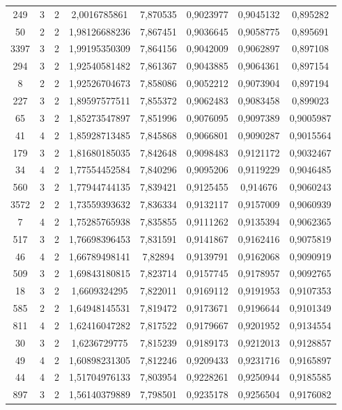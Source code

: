 \begin{longtable}{|c|c|c|c|c|c|c|c|}
249 & 3 & 2 & 2,0016785861 & 7,870535 & 0,9023977 & 0,9045132 & 0,895282 \\
50 & 2 & 2 & 1,98126688236 & 7,867451 & 0,9036645 & 0,9058775 & 0,895691 \\
3397 & 3 & 2 & 1,99195350309 & 7,864156 & 0,9042009 & 0,9062897 & 0,897108 \\
294 & 3 & 2 & 1,92540581482 & 7,861367 & 0,9043885 & 0,9064361 & 0,897154 \\
8 & 2 & 2 & 1,92526704673 & 7,858086 & 0,9052212 & 0,9073904 & 0,897194 \\
227 & 3 & 2 & 1,89597577511 & 7,855372 & 0,9062483 & 0,9083458 & 0,899023 \\
65 & 3 & 2 & 1,85273547897 & 7,851996 & 0,9076095 & 0,9097389 & 0,9005987 \\
41 & 4 & 2 & 1,85928713485 & 7,845868 & 0,9066801 & 0,9090287 & 0,9015564 \\
179 & 3 & 2 & 1,81680185035 & 7,842648 & 0,9098483 & 0,9121172 & 0,9032467 \\
34 & 4 & 2 & 1,77554452584 & 7,840296 & 0,9095206 & 0,9119229 & 0,9046485 \\
560 & 3 & 2 & 1,77944744135 & 7,839421 & 0,9125455 & 0,914676 & 0,9060243 \\
3572 & 2 & 2 & 1,73559393632 & 7,836334 & 0,9132117 & 0,9157009 & 0,9060939 \\
7 & 4 & 2 & 1,75285765938 & 7,835855 & 0,9111262 & 0,9135394 & 0,9062365 \\
517 & 3 & 2 & 1,76698396453 & 7,831591 & 0,9141867 & 0,9162416 & 0,9075819 \\
46 & 4 & 2 & 1,66789498141 & 7,82894 & 0,9139791 & 0,9162068 & 0,9090919 \\
509 & 3 & 2 & 1,69843180815 & 7,823714 & 0,9157745 & 0,9178957 & 0,9092765 \\
18 & 3 & 2 & 1,6609324295 & 7,822011 & 0,9169112 & 0,9191953 & 0,9107353 \\
585 & 2 & 2 & 1,64948145531 & 7,819472 & 0,9173671 & 0,9196644 & 0,9101349 \\
811 & 4 & 2 & 1,62416047282 & 7,817522 & 0,9179667 & 0,9201952 & 0,9134554 \\
30 & 3 & 2 & 1,6236729775 & 7,815239 & 0,9189173 & 0,9212013 & 0,9128857 \\
49 & 4 & 2 & 1,60898231305 & 7,812246 & 0,9209433 & 0,9231716 & 0,9165897 \\
44 & 4 & 2 & 1,51704976133 & 7,803954 & 0,9228261 & 0,9250944 & 0,9185585 \\
897 & 3 & 2 & 1,56140379889 & 7,798501 & 0,9235178 & 0,9256504 & 0,9176082 \\

\end{longtable}
